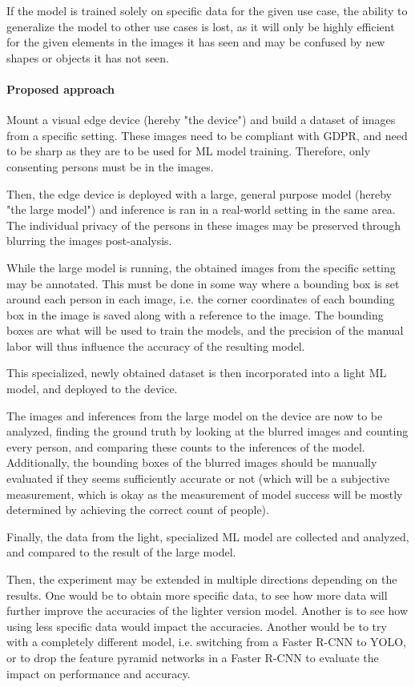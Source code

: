     If the model is trained solely on specific data for the given use case, the ability to generalize the model to other use cases is lost, as it will only be highly efficient for the given elements in the images it has seen and may be confused by new shapes or objects it has not seen. 
    
    \paragraph{Proposed approach}
    Mount a visual edge device (hereby "the device") and build a dataset of images from a specific setting. These images need to be compliant with GDPR, and need to be sharp as they are to be used for ML model training. Therefore, only consenting persons must be in the images.
    
    Then, the edge device is deployed with a large, general purpose model (hereby "the large model") and inference is ran in a real-world setting in the same area. The individual privacy of the persons in these images may be preserved through blurring the images post-analysis.  
    
    While the large model is running, the obtained images from the specific setting may be annotated. This must be done in some way where a bounding box is set around each person in each image, i.e. the corner coordinates of each bounding box in the image is saved along with a reference to the image. The bounding boxes are what will be used to train the models, and the precision of the manual labor will thus influence the accuracy of the resulting model.
    
    This specialized, newly obtained dataset is then incorporated into a light ML model, and deployed to the device.
    
    The images and inferences from the large model on the device are now to be analyzed, finding the ground truth by looking at the blurred images and counting every person, and comparing these counts to the inferences of the model. Additionally, the bounding boxes of the blurred images should be manually evaluated if they seems sufficiently accurate or not (which will be a subjective measurement, which is okay as the measurement of model success will be mostly determined by achieving the correct count of people). 
    
    Finally, the data from the light, specialized ML model are collected and analyzed, and compared to the result of the large model.

    Then, the experiment may be extended in multiple directions depending on the results. One would be to obtain more specific data, to see how more data will further improve the accuracies of the lighter version model. Another is to see how using less specific data would impact the accuracies. Another would be to try with a completely different model, i.e. switching from a Faster R-CNN to YOLO, or to drop the feature pyramid networks in a Faster R-CNN to evaluate the impact on performance and accuracy.

